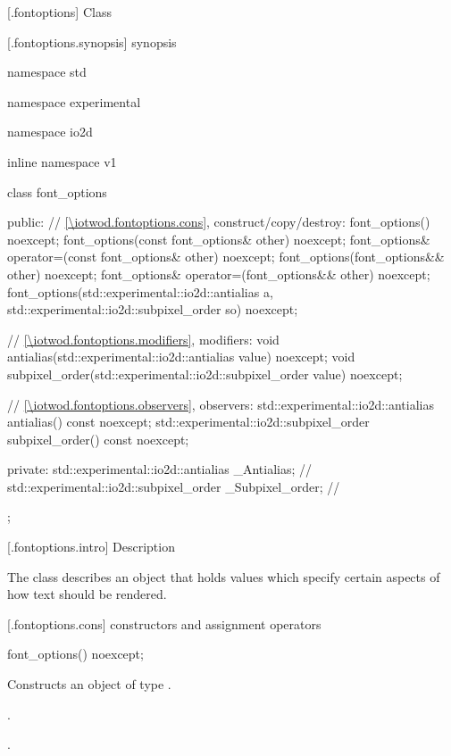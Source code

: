  [\iotwod.fontoptions] {Class }

 [\iotwod.fontoptions.synopsis] { synopsis}

\begin{codeblock}
namespace std { namespace experimental { namespace io2d { inline namespace v1 {
  class font_options {
    public:
    // \ref{\iotwod.fontoptions.cons}, construct/copy/destroy:
    font_options() noexcept;
    font_options(const font_options& other) noexcept;
    font_options& operator=(const font_options& other) noexcept;
    font_options(font_options&& other) noexcept;
    font_options& operator=(font_options&& other) noexcept;
    font_options(std::experimental::io2d::antialias a,
      std::experimental::io2d::subpixel_order so) noexcept;

    // \ref{\iotwod.fontoptions.modifiers}, modifiers:
    void antialias(std::experimental::io2d::antialias value) noexcept;
    void subpixel_order(std::experimental::io2d::subpixel_order value) noexcept;

    // \ref{\iotwod.fontoptions.observers}, observers:
    std::experimental::io2d::antialias antialias() const noexcept;
    std::experimental::io2d::subpixel_order subpixel_order() const noexcept;

  private:
    std::experimental::io2d::antialias _Antialias;           // \expos
    std::experimental::io2d::subpixel_order _Subpixel_order; // \expos
  };
} } } }
\end{codeblock}

 [\iotwod.fontoptions.intro] { Description}

\pnum
{}
The  class describes an object that holds values which specify certain aspects of how text should be rendered.

 [\iotwod.fontoptions.cons] { constructors and assignment operators}

\begin{itemdecl}
    font_options() noexcept;
\end{itemdecl}
\begin{itemdescr}
	\pnum
	\effects
	Constructs an object of type .
	
	\pnum
	\postconditions
	.
	
	.
	
\end{itemdescr}

